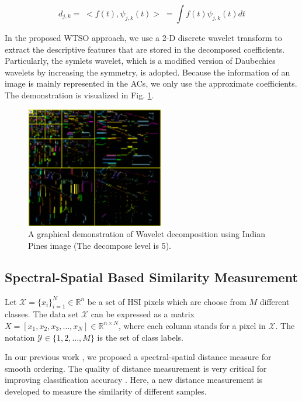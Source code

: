 \documentclass{ws-ijwmip}
\begin{document}
\begin{equation}
d_{j,k} =\; < f(t),\psi _{j,k}(t)>\; =\int f(t) \psi _{j,k}(t)dt
\label{equ2.5}
\end{equation}

In the proposed WTSO approach, we use a 2-D discrete wavelet transform to extract the descriptive features that are stored in the decomposed coefficients.
Particularly, the symlets wavelet, which is a modified version of Daubechies wavelets by increasing the symmetry, is adopted. 
Because the information of an image is mainly represented in the ACs, we only use the approximate coefficients. The demonstration is visualized in Fig. \ref{figure2}. 

\begin{figure}[htb]
	\centerline{\includegraphics[width=6cm]{image/decompose}}
	\vspace*{8pt}
	\caption{
		A graphical demonstration of Wavelet decomposition using Indian Pines image
		(The decompose level is 5).
	}
	\label{figure2}
\end{figure}


\subsection{Spectral-Spatial Based Similarity Measurement}
Let $\mathcal{X}=\{x_i\}_{i=1}^N\in \mathbb{R}^n$ be a set of HSI pixels which are choose from $M$ different classes. The data set $\mathcal{X}$ can be expressed as a matrix $X = [x_1,x_2,x_3,\dots,x_N] \in \mathbb{R}^{n\times N}$, where each column stands for a pixel in $\mathcal{X}$. The notation $\mathcal{Y} \in \{1,2,\dots,M\}$ is the set of class labels. 

In our previous work \cite{31}, we proposed a spectral-spatial distance measure for smooth ordering. The quality of distance measurement is very critical for improving classification accuracy \cite{ML1DE}. Here, a new distance measurement is developed to measure the similarity of different samples. 
\end{document}
